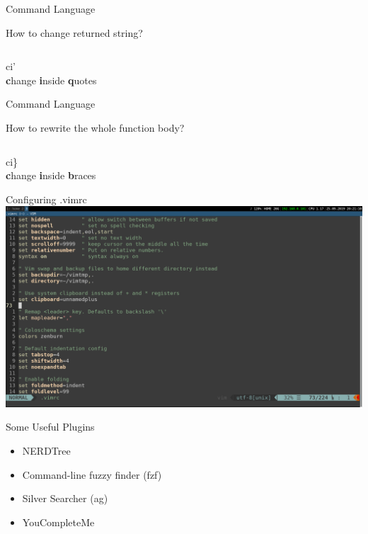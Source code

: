 \documentclass{beamer}
\begin{document}
\begin{frame}{Command Language}
    \begin{block}{How to change returned string?}
    \end{block}
    \inputminted{js}{codes/changeInsideQuotes.js}
    \pause
    \begin{center}
        \huge
        ci'
        \\
        \textbf{c}hange \textbf{i}nside \textbf{q}uotes
    \end{center}
\end{frame}

\begin{frame}{Command Language}
    \begin{block}{How to rewrite the whole function body?}
    \end{block}
    \inputminted{js}{codes/changeInsideBlock.js}
    \pause
    \begin{center}
        \huge
        ci\}
        \\
        \textbf{c}hange \textbf{i}nside \textbf{b}races
    \end{center}
\end{frame}

\begin{frame}{Configuring .vimrc}
    \includegraphics[width=1\textwidth]{images/vimrc.png}
\end{frame}

\begin{frame}{Some Useful Plugins}
    \begin{itemize}
        \item NERDTree
        \item Command-line fuzzy finder (fzf)
        \item Silver Searcher (ag)
        \item YouCompleteMe
    \end{itemize}
\end{frame}
\end{document}
